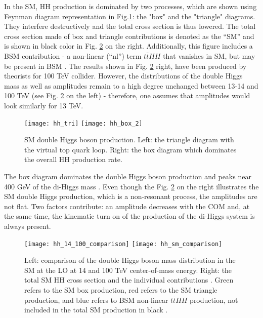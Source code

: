In the SM, HH production is dominated by two processes, which are shown using Feynman diagram representation in Fig.\ref{SM_HH}: the "box" and the "triangle" diagrams. They interfere destructively and the total cross section is thus lowered. The total cross section made of box and triangle contributions is denoted as the ``SM'' and is shown in black color in Fig. \ref{hh_comparison} on the right. Additionally, this figure includes a BSM contribution - a non-linear (``nl'') term $t\bar{t}HH$ that vanishes in SM, but may be present in BSM \cite{Contino:2012xk}. The results shown in Fig. \ref{hh_comparison} right, have been produced by theorists \cite{Chen:2014xra} for 100 TeV collider. However, the distributions of the double Higgs mass as well as amplitudes remain to a high degree unchanged between 13-14 and 100 TeV (see Fig. \ref{hh_comparison} on the left) - therefore, one assumes that amplitudes would look similarly for 13 TeV. 

\begin{figure}[H]
  \centering
    \texttt{[image: hh\_tri]}
     \texttt{[image: hh\_box\_2]}
    \caption[SM double Higgs boson production]{SM double Higgs boson production. Left: the triangle diagram with the virtual top quark loop. Right: the box diagram which dominates the overall HH production rate.}
    \label{SM_HH}
\end{figure}

The box diagram dominates the double Higgs boson production and peaks near 400 GeV of the di-Higgs mass \cite{Chen:2014xra}. Even though the Fig. \ref{hh_comparison} on the right illustrates the SM double Higgs production, which is a non-resonant process, the amplitudes are not flat. Two factors contribute: an amplitude decreases with the COM and, at the same time, the kinematic turn on of the production of the di-Higgs system is always present. 



\begin{figure}[H]
  \centering 
    \texttt{[image: hh\_14\_100\_comparison]}
    \texttt{[image: hh\_sm\_comparison]}
    \caption[Double Higgs mass distribution and the total cross-section]{Left: comparison of the double Higgs boson mass distribution in the SM at the LO at 14 and 100 TeV center-of-mass energy. Right: the total SM HH cross section and the individual contributions \cite{Contino:2012xk}. Green refers to the SM box production, red refers to the SM triangle production, and blue refers to BSM non-linear $t\bar{t}HH$ production, not included in the total SM production in black \cite{Chen:2014xra}. }
    \label{hh_comparison}
\end{figure}




